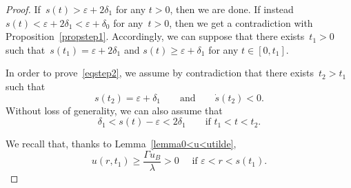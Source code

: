 \documentclass[12pt,a4paper,intlimits,sumlimits]{amsart}
\theoremstyle{definition}
\theoremstyle{plain}
\numberwithin{equation}{section}
\renewcommand{\geq}{\geqslant}
\begin{document}
\begin{proof}
If~$s(t)> \varepsilon+2\delta_1$ for any $t>0$, then we are done. If instead~$s(t)< \varepsilon+2\delta_1<\varepsilon+\delta_0$ for any~$t>0$, then we get a contradiction with Proposition~\ref{propstep1}.
Accordingly, we can suppose that there exists~$t_1>0$ such that~$s(t_1)=\varepsilon+2\delta_1$ and $s(t)\geq \varepsilon+\delta_1$ for any $t\in [0,t_1]$.

In order to prove~\eqref{eqstep2}, we assume by contradiction that there exists~$t_2>t_1$ such that
\begin{equation}\label{zxdrtfcfgty}
s(t_2)=\varepsilon+\delta_1  \qquad \mbox{and}\qquad \dot s(t_2)< 0.
\end{equation}
Without loss of generality, we can also assume that
\begin{equation}\label{zxdrtfcfgty1}
\delta_1<s(t)-\varepsilon<2\delta_1 \qquad \mbox{if } t_1<t<t_2.
\end{equation}

We recall that, thanks to Lemma~\ref{lemma0<u<utilde},
\begin{equation}\label{xcftyvbhjmk}
u(r,t_1)\geq \frac{\Gamma u_B}{\lambda}>0
\quad \mbox{ if } \varepsilon<r<s(t_1).
\end{equation}


\end{proof}
\end{document}
